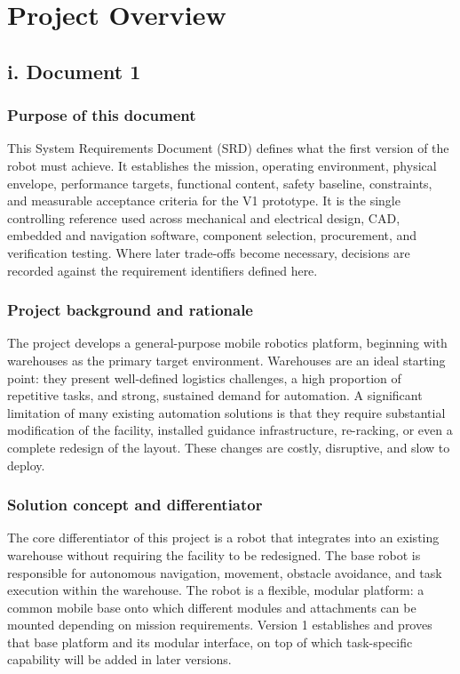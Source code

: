 \chapter{Project Overview}

\section*{i. Document 1}

\subsection*{Purpose of this document}

This System Requirements Document (SRD) defines what the first version of the robot must achieve. It establishes the mission, operating environment, physical envelope, performance targets, functional content, safety baseline, constraints, and measurable acceptance criteria for the V1 prototype. It is the single controlling reference used across mechanical and electrical design, CAD, embedded and navigation software, component selection, procurement, and verification testing. Where later trade-offs become necessary, decisions are recorded against the requirement identifiers defined here.

\subsection*{Project background and rationale}

The project develops a general-purpose mobile robotics platform, beginning with warehouses as the primary target environment. Warehouses are an ideal starting point: they present well-defined logistics challenges, a high proportion of repetitive tasks, and strong, sustained demand for automation. A significant limitation of many existing automation solutions is that they require substantial modification of the facility, installed guidance infrastructure, re-racking, or even a complete redesign of the layout. These changes are costly, disruptive, and slow to deploy.

\subsection*{Solution concept and differentiator}

The core differentiator of this project is a robot that integrates into an existing warehouse without requiring the facility to be redesigned. The base robot is responsible for autonomous navigation, movement, obstacle avoidance, and task execution within the warehouse. The robot is a flexible, modular platform: a common mobile base onto which different modules and attachments can be mounted depending on mission requirements. Version 1 establishes and proves that base platform and its modular interface, on top of which task-specific capability will be added in later versions.

